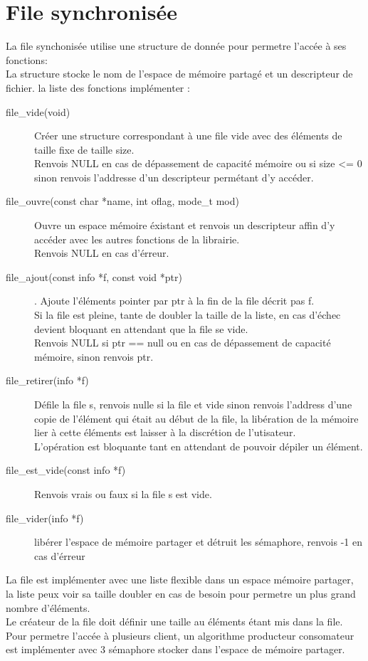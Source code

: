 \documentclass[12pt]{article}
\begin{document}
\section{File synchronisée}
    La file synchonisée utilise une structure de donnée pour permetre l'accée à ses fonctions:\\
    La structure stocke le nom de l'espace de mémoire partagé et un descripteur de fichier.
    la liste des fonctions implémenter :
    \begin{description}
        \item [file\_vide(void)] Créer une structure correspondant à une file vide avec des éléments de taille
        fixe de taille size.\\
        Renvois NULL en cas de dépassement de capacité mémoire ou si size <= 0\\
        sinon renvois l'addresse d'un descripteur permétant d'y accéder.

        \item [file\_ouvre(const char *name, int oflag, mode\_t mod)] Ouvre un espace mémoire éxistant et renvois un descripteur affin d'y accéder avec les autres fonctions de la librairie.\\
        Renvois NULL en cas d'érreur.

        \item [file\_ajout(const info *f, const void *ptr)].
        Ajoute l'éléments pointer par ptr à la fin de la file décrit pas f.\\
        Si la file est pleine, tante de doubler la taille de la liste, en cas d'échec\\
        devient bloquant en attendant que la file se vide.\\
        Renvois NULL si ptr == null ou en cas de dépassement de capacité mémoire, sinon renvois ptr.

        \item [file\_retirer(info *f)] Défile la file s, renvois nulle si la file et vide sinon renvois l'address d'une copie de l'élément qui était au début de la file, la libération de la mémoire lier à cette éléments est laisser à la discrétion de l'utisateur.\\
        L'opération est bloquante tant en attendant de pouvoir dépiler un élément.

        \item [file\_est\_vide(const info *f)] Renvois vrais ou faux si la file s est vide.

        \item [file\_vider(info *f)] libérer l'espace de mémoire partager et détruit les sémaphore, renvois -1 en cas d'érreur
    \end{description}
    La file est implémenter avec une liste flexible dans un espace mémoire partager, la liste peux voir sa taille doubler en cas de besoin pour permetre un plus grand nombre d'éléments. \\
    Le créateur de la file doit définir une taille au éléments étant mis dans la file.\\
    Pour permetre l'accée à plusieurs client, un algorithme producteur consomateur est implémenter avec 3 sémaphore stocker dans l'espace de mémoire partager.
\end{document}
